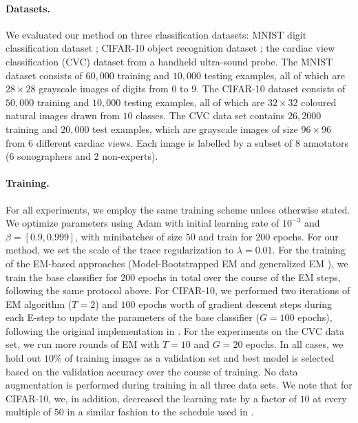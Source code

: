 \paragraph{Datasets. } We evaluated our method on three classification datasets: MNIST digit classification dataset \cite{lecun1998gradient}; CIFAR-10 object recognition dataset \cite{krizhevsky2009learning}; the cardiac view classification (CVC) dataset from a handheld ultra-sound probe. The MNIST dataset consists of $60,000$ training and $10,000$ testing examples, all of which are $28\times28$ grayscale images of digits from $0$ to $9$. The CIFAR-10 dataset consists of $50,000$ training and $10,000$ testing examples, all of which are $32\times32$ coloured natural images drawn from $10$ classes. The CVC data set contains $26,2000$ training and $20,000$ test examples, which are grayscale images of size $96\times96$ from $6$ different cardiac views. Each image is labelled by a subset of $8$ annotators ($6$ sonographers and $2$ non-experts).  
\vspace{-2mm}
\paragraph{Training. } For all experiments, we employ the same training scheme unless otherwise stated. We optimize parameters using Adam \cite{kingma2014adam} with initial learning rate of $10^{-3}$ and $\beta = [0.9, 0.999]$, with minibatches of size $50$ and train for $200$ epochs. For our method, we set the scale of the trace regularization to $\lambda=0.01$. For the training of the EM-based approaches (Model-Bootstrapped EM \cite{khetan2017learning} and generalized EM \cite{raykar2009supervised}), we train the base classifier for $200$ epochs in total over the course of the EM steps, following the same protocol above. For CIFAR-10, we performed two iterations of EM algorithm ($T=2$) and $100$ epochs worth of gradient descent steps during each E-step to update the parameters of the base classifier ($G=100$ epochs), following the original implementation in \cite{khetan2017learning}. For the experiments on the CVC data set, we run more rounds of EM with $T=10$ and $G=20 $ epochs. In all cases, we hold out $10\%$ of training images as a validation set and best model is selected based on the validation accuracy over the course of training. No data augmentation is performed during training in all three data sets. We note that for CIFAR-10, we, in addition, decreased the learning rate by a factor of $10$ at every multiple of $50$ in a similar fashion to the schedule used in \cite{Huang2017LearningDR,he2016deep,springenberg2014striving}.
\vspace{-2mm}
